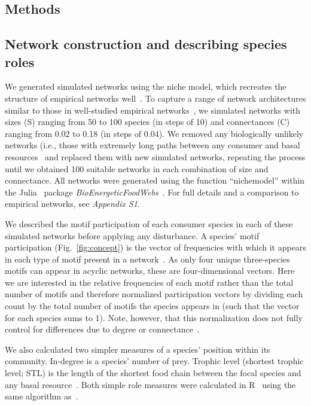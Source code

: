 \documentclass[12pt]{article}
\begin{document}
\begin{spacing}{2.0}
\section*{Methods}

    \subsection*{Network construction and describing species roles}

        We generated simulated networks using the niche model, which recreates the structure of empirical networks well~\citep{Williams2000,Stouffer2007}.
        To capture a range of network architectures similar to those in well-studied empirical networks~\citep{Dunne2002,Dunne2002e}, we simulated networks with sizes (S) ranging from 50 to 100 species (in steps of 10) and connectances (C) ranging from 0.02 to 0.18 (in steps of 0.04). 
        We removed any biologically unlikely networks (i.e., those with extremely long paths between any consumer and basal resources~\citep{Borrelli2014} and replaced them with new simulated networks, repeating the process until we obtained 100 suitable networks in each combination of size and connectance.
        All networks were generated using the function ``nichemodel'' within the Julia~\citep{Bezanson2017julia} package \emph{BioEnergeticFoodWebs}~\citep{bioenergfw,Delmas2017}.     For full details and a comparison to empirical networks, see \emph{Appendix S1}.

        
        We described the motif participation of each consumer species in each of these simulated networks before applying any disturbance. 
        A species' motif participation (Fig.~\ref{fig:concept}) is the vector of frequencies with which it appears in each type of motif present in a network~\citep{Stouffer2012}.
        As only four unique three-species motifs can appear in acyclic networks, these are four-dimensional vectors. 
        Here we are interested in the relative frequencies of each motif rather than the total number of motifs and therefore normalized participation vectors by dividing each count by the total number of motifs the species appears in (such that the vector for each species sums to 1).
        Note, however, that this normalization does not fully control for differences due to degree or connectance~\citep{Cirtwill2022Oikos}. 


        We also calculated two simpler measures of a species' position within its community.
        In-degree is a species' number of prey.
        Trophic level (shortest trophic level; STL) is the length of the shortest food chain between the focal species and any basal resource~\citep{Williams2004}.
        Both simple role measures were calculated in R~\citep{R} using the same algorithm as~\citet{Eklof2013}.


\end{spacing}
\end{document}
